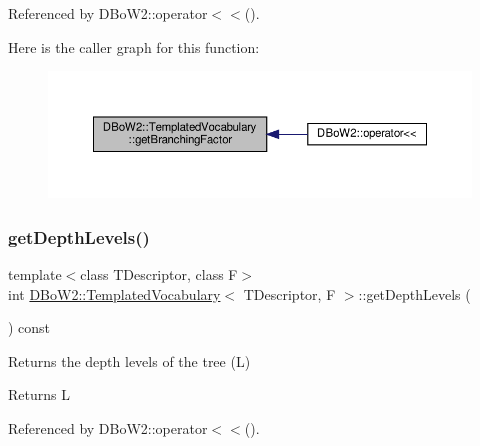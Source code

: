 Referenced by D\+Bo\+W2\+::operator$<$$<$().

Here is the caller graph for this function\+:\nopagebreak
\begin{figure}[H]
\begin{center}
\leavevmode
\includegraphics[width=350pt]{classDBoW2_1_1TemplatedVocabulary_a027d367760c39de816bee5ff0d969837_icgraph}
\end{center}
\end{figure}
\mbox{\label{classDBoW2_1_1TemplatedVocabulary_a5a7d1b3ad0c705705d516a9a144e3f38}} 
\subsubsection{\texorpdfstring{get\+Depth\+Levels()}{getDepthLevels()}}
{\footnotesize\ttfamily template$<$class T\+Descriptor, class F$>$ \\
int \hyperlink{classDBoW2_1_1TemplatedVocabulary}{D\+Bo\+W2\+::\+Templated\+Vocabulary}$<$ T\+Descriptor, F $>$\+::get\+Depth\+Levels (\begin{DoxyParamCaption}{ }\end{DoxyParamCaption}) const\hspace{0.3cm}{\ttfamily [inline]}}

Returns the depth levels of the tree (L) \begin{DoxyReturn}{Returns}
L 
\end{DoxyReturn}


Referenced by D\+Bo\+W2\+::operator$<$$<$().

